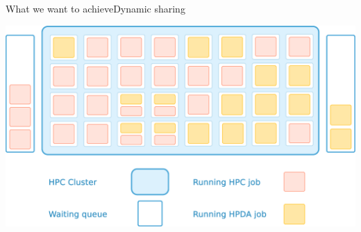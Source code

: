 \documentclass[10pt, compress, titleprogressbar, aspectratio=169]{beamer}
\begin{document}
        \begin{frame}{What we want to achieve}{Dynamic sharing}
            \begin{center}
                \includegraphics[width=\linewidth,height=\textheight,keepaspectratio]{./img/mixed_workload_cluster.eps}
            \end{center}
        \end{frame}
\end{document}
